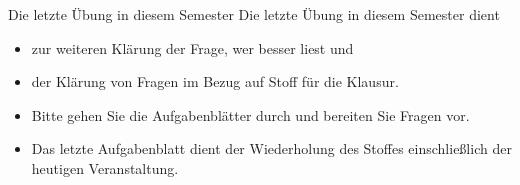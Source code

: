 \documentclass[usenames,dvipsnames,handout]{beamer}
\begin{document}

\begin{frame}{Die letzte Übung in diesem Semester}
Die letzte Übung in diesem Semester dient
\begin{itemize}
\item{zur weiteren Klärung der Frage, wer besser liest und}
\item{der Klärung von Fragen im Bezug auf Stoff für die Klausur.}
\item{Bitte gehen Sie die Aufgabenblätter durch und bereiten Sie Fragen vor.}
\item{Das letzte Aufgabenblatt dient der Wiederholung des Stoffes einschließlich der heutigen
Veranstaltung.}
\end{itemize}
\end{frame}
\end{document}
